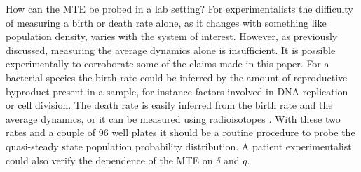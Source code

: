 \documentclass[a4paper,10pt]{article}
\numberwithin{equation}{section} %
\begin{document}
How can the MTE be probed in a lab setting? 
For experimentalists the difficulty of measuring a birth or death rate alone, as it changes with something like population density, varies with the system of interest. 
However, as previously discussed, measuring the average dynamics alone is insufficient. 
It is possible experimentally to corroborate some of the claims made in this paper. 
For a bacterial species the birth rate could be inferred by the amount of reproductive byproduct present in a sample, for instance factors involved in DNA replication or cell division. %
The death rate is easily inferred from the birth rate and the average dynamics, or it can be measured using radioisotopes \cite{Servais1985}. %
With these two rates and a couple of 96 well plates it should be a routine procedure to probe the quasi-steady state population probability distribution. 
A patient experimentalist could also verify the dependence of the MTE on $\delta$ and $q$.  %
\end{document}
